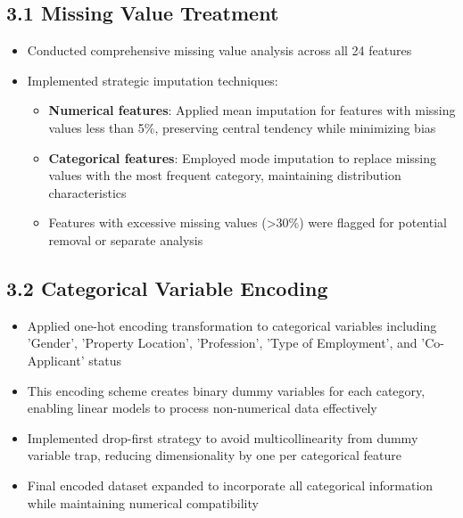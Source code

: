 \documentclass[11pt]{article}
\begin{document}
\subsection*{3.1 Missing Value Treatment}
\begin{itemize}
\item Conducted comprehensive missing value analysis across all 24 features
\item Implemented strategic imputation techniques:
\begin{itemize}
\item \textbf{Numerical features}: Applied mean imputation for features with missing values less than 5\%, preserving central tendency while minimizing bias
\item \textbf{Categorical features}: Employed mode imputation to replace missing values with the most frequent category, maintaining distribution characteristics
\item Features with excessive missing values (>30\%) were flagged for potential removal or separate analysis
\end{itemize}
\end{itemize}

\subsection*{3.2 Categorical Variable Encoding}
\begin{itemize}
\item Applied one-hot encoding transformation to categorical variables including 'Gender', 'Property Location', 'Profession', 'Type of Employment', and 'Co-Applicant' status
\item This encoding scheme creates binary dummy variables for each category, enabling linear models to process non-numerical data effectively
\item Implemented drop-first strategy to avoid multicollinearity from dummy variable trap, reducing dimensionality by one per categorical feature
\item Final encoded dataset expanded to incorporate all categorical information while maintaining numerical compatibility
\end{itemize}
\end{document}

